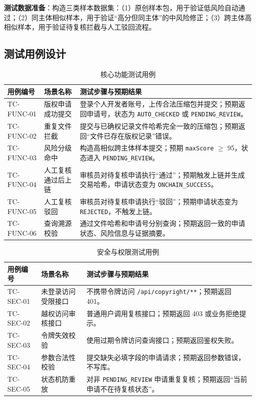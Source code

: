 \documentclass[UTF8,a4paper,12pt]{ctexart}
\begin{document}
\indent\textbf{测试数据准备}：构造三类样本数据集：（1）原创样本包，用于验证低风险自动通过；（2）同主体相似样本，用于验证“高分但同主体”的中风险修正；（3）跨主体高相似样本，用于验证待复核拦截与人工驳回流程。\par

\subsection{测试用例设计}
\begin{table}[H]
  \centering
  \caption{核心功能测试用例}
  \begin{tabularx}{0.96\textwidth}{l l Y}
    \toprule
    用例编号 & 场景名称 & 测试步骤与预期结果 \\
    \midrule
    TC-FUNC-01 & 版权申请成功提交 & 登录个人开发者账号，上传合法压缩包并提交；预期返回申请号，状态为 \texttt{AUTO\_CHECKED} 或 \texttt{PENDING\_REVIEW}。 \\
    TC-FUNC-02 & 重复文件拦截 & 提交与已确权记录文件哈希完全一致的压缩包；预期返回“文件已存在版权记录”错误。 \\
    TC-FUNC-03 & 风险分级命中 & 构造高相似跨主体样本提交；预期 \texttt{maxScore} $\ge$ 95，状态进入 \texttt{PENDING\_REVIEW}。 \\
    TC-FUNC-04 & 人工复核通过后上链 & 审核员对待复核申请执行“通过”；预期触发上链并生成交易哈希，申请状态变为 \texttt{ONCHAIN\_SUCCESS}。 \\
    TC-FUNC-05 & 人工复核驳回 & 审核员对待复核申请执行“驳回”；预期申请状态变为 \texttt{REJECTED}，不触发上链。 \\
    TC-FUNC-06 & 查询溯源校验 & 通过文件哈希和申请号分别查询；预期返回一致的申请状态、风险信息与证据摘要。 \\
    \bottomrule
  \end{tabularx}
\end{table}

\begin{table}[H]
  \centering
  \caption{安全与权限测试用例}
  \begin{tabularx}{0.96\textwidth}{l l Y}
    \toprule
    用例编号 & 场景名称 & 测试步骤与预期结果 \\
    \midrule
    TC-SEC-01 & 未登录访问受限接口 & 不携带令牌访问 \texttt{/api/copyright/**}；预期返回 401。 \\
    TC-SEC-02 & 越权访问审核接口 & 普通用户调用复核接口；预期返回 403 或业务拒绝提示。 \\
    TC-SEC-03 & 令牌失效校验 & 使用过期令牌访问查询接口；预期返回鉴权失败。 \\
    TC-SEC-04 & 参数合法性校验 & 提交缺失必填字段的申请请求；预期返回参数错误，不写库。 \\
    TC-SEC-05 & 状态机防重放 & 对非 \texttt{PENDING\_REVIEW} 申请重复复核；预期返回“当前申请不在待复核状态”。 \\
    \bottomrule
  \end{tabularx}
\end{table}
\end{document}
